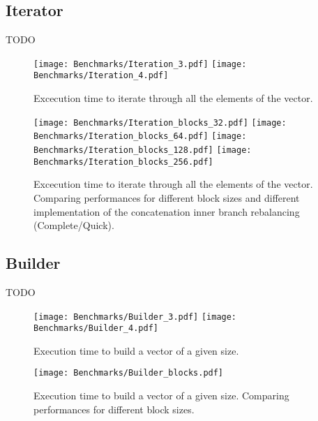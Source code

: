 \subsection{Iterator}
\color{red} TODO \color{black}

\begin{figure}[h!]
  \centering
  \texttt{[image: Benchmarks/Iteration\_3.pdf]}
  \texttt{[image: Benchmarks/Iteration\_4.pdf]}
  \label{IterationBenchmarks}
  \caption{Excecution time to iterate through all the elements of the vector.}
\end{figure}

\begin{figure}[h!]
  \centering
  \label{IterationBlocksBenchmarks}
  \texttt{[image: Benchmarks/Iteration\_blocks\_32.pdf]}
  \texttt{[image: Benchmarks/Iteration\_blocks\_64.pdf]}
  \texttt{[image: Benchmarks/Iteration\_blocks\_128.pdf]}
  \texttt{[image: Benchmarks/Iteration\_blocks\_256.pdf]}
  \caption{Excecution time to iterate through all the elements of the vector. Comparing performances for different block sizes and different implementation of the concatenation inner branch rebalancing (Complete/Quick).}
\end{figure}

\FloatBarrier

\subsection{Builder}
\color{red} TODO \color{black}

\begin{figure}[h!]
  \centering
  \texttt{[image: Benchmarks/Builder\_3.pdf]}
  \texttt{[image: Benchmarks/Builder\_4.pdf]}
  \label{BuilderBenchmarks}
  \caption{Execution time to build a vector of a given size.}
\end{figure}

\begin{figure}[h!]
  \centering
  \texttt{[image: Benchmarks/Builder\_blocks.pdf]}
  \label{BuilderBlocksBenchmarks}
  \caption{Execution time to build a vector of a given size. Comparing performances for different block sizes.}
\end{figure}


